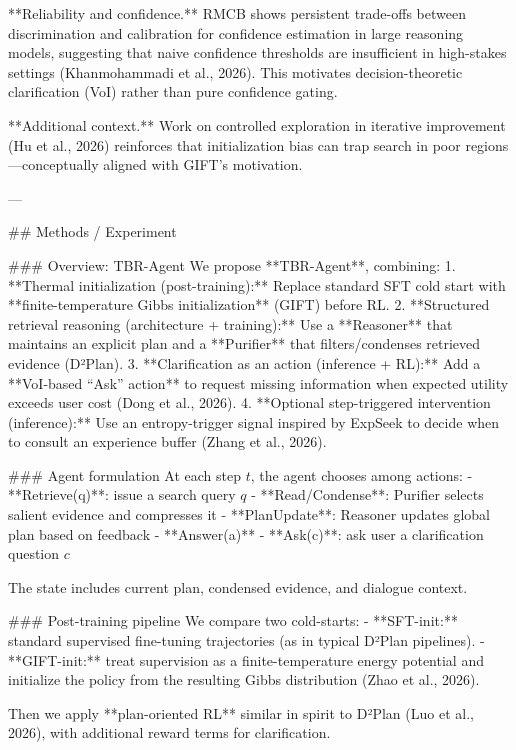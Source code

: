 **Reliability and confidence.** RMCB shows persistent trade-offs between discrimination and calibration for confidence estimation in large reasoning models, suggesting that naive confidence thresholds are insufficient in high-stakes settings (Khanmohammadi et al., 2026). This motivates decision-theoretic clarification (VoI) rather than pure confidence gating.  

**Additional context.** Work on controlled exploration in iterative improvement (Hu et al., 2026) reinforces that initialization bias can trap search in poor regions—conceptually aligned with GIFT’s motivation.  

---

## Methods / Experiment  

### Overview: TBR-Agent  
We propose **TBR-Agent**, combining:  
1. **Thermal initialization (post-training):** Replace standard SFT cold start with **finite-temperature Gibbs initialization** (GIFT) before RL.  
2. **Structured retrieval reasoning (architecture + training):** Use a **Reasoner** that maintains an explicit plan and a **Purifier** that filters/condenses retrieved evidence (D²Plan).  
3. **Clarification as an action (inference + RL):** Add a **VoI-based “Ask” action** to request missing information when expected utility exceeds user cost (Dong et al., 2026).  
4. **Optional step-triggered intervention (inference):** Use an entropy-trigger signal inspired by ExpSeek to decide when to consult an experience buffer (Zhang et al., 2026).  

### Agent formulation  
At each step \(t\), the agent chooses among actions:  
- **Retrieve(q)**: issue a search query \(q\)  
- **Read/Condense**: Purifier selects salient evidence and compresses it  
- **PlanUpdate**: Reasoner updates global plan based on feedback  
- **Answer(a)**  
- **Ask(c)**: ask user a clarification question \(c\)  

The state includes current plan, condensed evidence, and dialogue context.

### Post-training pipeline  
We compare two cold-starts:  
- **SFT-init:** standard supervised fine-tuning trajectories (as in typical D²Plan pipelines).  
- **GIFT-init:** treat supervision as a finite-temperature energy potential and initialize the policy from the resulting Gibbs distribution (Zhao et al., 2026).  

Then we apply **plan-oriented RL** similar in spirit to D²Plan (Luo et al., 2026), with additional reward terms for clarification.

